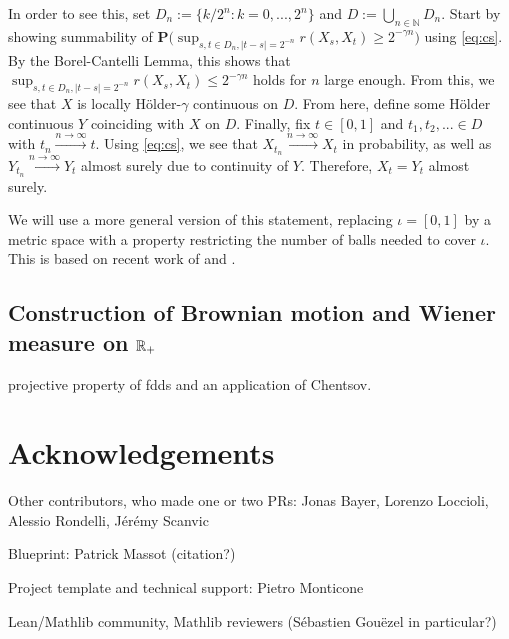 \documentclass[lean]{DraftAFM}
\begin{document}
In order to see this, set $D_n := \{k/2^n: k=0,...,2^n\}$ and $D := \bigcup_{n\in\mathbb N} D_n$. Start by showing summability of $\mathbf P\Big( \sup_{s,t\in D_n, |t-s| = 2^{-n}} r(X_s, X_t) \geq 2^{-\gamma n} \Big)$ using \eqref{eq:cs}. By the Borel-Cantelli Lemma, this shows that $\sup_{s,t\in D_n, |t-s| = 2^{-n}} r(X_s, X_t) \leq 2^{-\gamma n}$ holds for $n$ large enough. From this, we see that $X$ is locally Hölder-$\gamma$ continuous on $D$. From here, define some Hölder continuous $Y$ coinciding with $X$ on $D$. Finally, fix $t \in [0,1]$ and $t_1, t_2,...\in D$ with $t_n \xrightarrow{n\to\infty} t$. Using \eqref{eq:cs}, we see that $X_{t_n} \xrightarrow{n\to\infty} X_t$ in probability, as well as $Y_{t_n} \xrightarrow{n\to\infty} Y_t$ almost surely due to continuity of $Y$. Therefore, $X_t = Y_t$ almost surely.

We will use a more general version of this statement, replacing $\iota = [0,1]$ by a metric space with a property restricting the number of balls needed to cover $\iota$. This is based on recent work of \cite{talagrand2022upper} and \cite{kratschmer2023kolmogorov}.



\subsection{Construction of Brownian motion and Wiener measure on $\mathbb{R}_+$}
projective property of fdds and an application of Chentsov.


\section{Acknowledgements}
Other contributors, who made one or two PRs: Jonas Bayer, Lorenzo Loccioli, Alessio Rondelli, Jérémy Scanvic

Blueprint: Patrick Massot (citation?)

Project template \cite{Monticone_LeanProject_2025} and technical support: Pietro Monticone

Lean/Mathlib community, Mathlib reviewers (Sébastien Gouëzel in particular?)

\printbibliography
\end{document}
